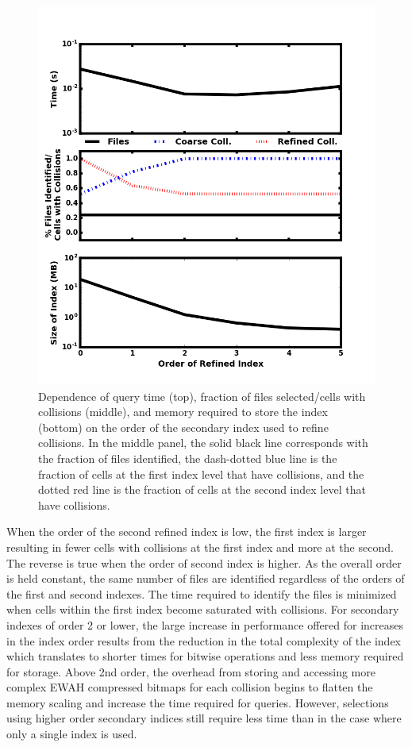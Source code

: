 \documentclass[apjl]{emulateapj}
\begin{document}
\begin{figure}[htbp]
\begin{center}
\includegraphics[width=\columnwidth,keepaspectratio]{../images/vary_order2_to6.png}
\caption{Dependence of query time (top), fraction of files selected/cells with collisions (middle), and memory required to store the index (bottom) on the order of the secondary index used to refine collisions. In the middle panel, the solid black line corresponds with the fraction of files identified, the dash-dotted blue line is the fraction of cells at the first index level that have collisions, and the dotted red line is the fraction of cells at the second index level that have collisions.}
\label{fig:test_order2}
\end{center}
\end{figure}
%

When the order of the second refined index is low, the first index is larger resulting in fewer cells with collisions at the first index and more at the second. The reverse is true when the order of second index is higher. As the overall order is held constant, the same number of files are identified regardless of the orders of the first and second indexes. The time required to identify the files is minimized when cells within the first index become saturated with collisions. For secondary indexes of order 2 or lower, the large increase in performance offered for increases in the index order results from the reduction in the total complexity of the index which translates to shorter times for bitwise operations and less memory required for storage. Above 2nd order, the overhead from storing and accessing more complex EWAH compressed bitmaps for each collision begins to flatten the memory scaling and increase the time required for queries.  However, selections using higher order secondary indices still require less time than in the case where only a single index is used. 
\end{document}
